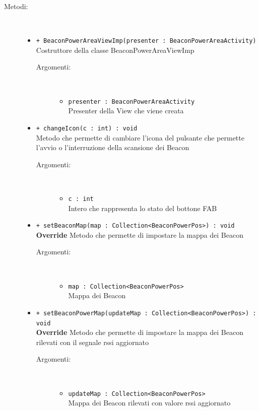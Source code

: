 \documentclass[../DefinizioneDiProdotto.tex]{subfiles}
\begin{document}
\begin{description}
\begin{itemize}
	\end{itemize}
	\item[Metodi:] \
	\begin{itemize}
		\item \texttt{+ BeaconPowerAreaViewImp(presenter : BeaconPowerAreaActivity)}\\
		Costruttore della classe BeaconPowerAreaViewImp
		\begin{description}
			\item[Argomenti:] \
			\begin{itemize}
				\item \texttt{presenter : BeaconPowerAreaActivity}\\
				Presenter della View che viene creata\end{itemize}
		\end{description}
		\item \texttt{+ changeIcon(c : int) : void}\\
		Metodo che permette di cambiare l'icona del pulsante che permette l'avvio o l'interruzione della scansione dei Beacon
		\begin{description}
			\item[Argomenti:] \
			\begin{itemize}
				\item \texttt{c : int}\\
				Intero che rappresenta lo stato del bottone FAB\end{itemize}
		\end{description}
		\item \texttt{+ setBeaconMap(map : Collection<BeaconPowerPos>) : void}\\
		\textbf{Override} Metodo che permette di impostare la mappa dei Beacon
		\begin{description}
			\item[Argomenti:] \
			\begin{itemize}
				\item \texttt{map : Collection<BeaconPowerPos>}\\
				Mappa dei Beacon\end{itemize}
		\end{description}
		\item \texttt{+ setBeaconPowerMap(updateMap : Collection<BeaconPowerPos>) : void}\\
		\textbf{Override} Metodo che permette di impostare la mappa dei Beacon rilevati con il segnale rssi aggiornato
		\begin{description}
			\item[Argomenti:] \
			\begin{itemize}
				\item \texttt{updateMap : Collection<BeaconPowerPos>}\\
				Mappa dei Beacon rilevati con valore rssi aggiornato\end{itemize}
		\end{description}
	\end{itemize}
\end{description}
\end{document}
